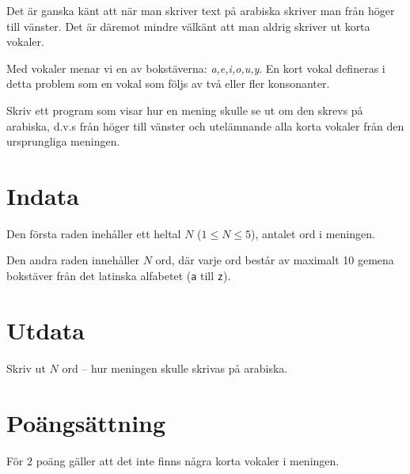 Det är ganska känt att när man skriver text på arabiska skriver man från höger till vänster.
Det är däremot mindre välkänt att man aldrig skriver ut korta vokaler.

Med vokaler menar vi en av bokstäverna: \textit{a,e,i,o,u,y}.
En kort vokal defineras i detta problem som en vokal som följs av två eller fler konsonanter.

Skriv ett program som visar hur en mening skulle se ut om den skrevs på arabiska, d.v.s från höger till vänster och utelämnande alla korta vokaler från den ursprungliga meningen.

\section*{Indata}
Den första raden inehåller ett heltal $N$ ($1 \le N \le 5$), antalet ord i meningen.

Den andra raden innehåller $N$ ord, där varje ord består av maximalt 10 gemena bokstäver från det latinska alfabetet (\texttt{a} till \texttt{z}).

\section*{Utdata}
Skriv ut $N$ ord -- hur meningen skulle skrivas på arabiska.

\section*{Poängsättning}
För 2 poäng gäller att det inte finns några korta vokaler i meningen.\\
